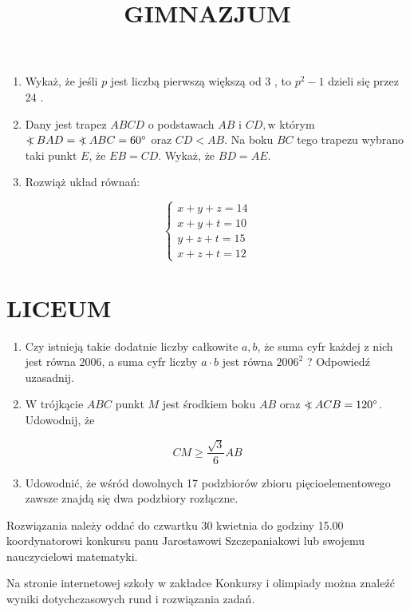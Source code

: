 \documentclass[10pt]{article}
\title{GIMNAZJUM }
\author{}
\date{}
\newcommand\Varangle{\mathop{{<\!\!\!\!\!\text{\small)}}\:}\nolimits}
\begin{document}
\maketitle
\begin{enumerate}
  \item Wykaż, że jeśli \(p\) jest liczbą pierwszą większą od 3 , to \(p^{2}-1\) dzieli się przez 24 .
  \item Dany jest trapez \(A B C D\) o podstawach \(A B\) i \(C D, \mathrm{w}\) którym \(\Varangle B A D=\Varangle A B C=60^{\circ}\) oraz \(C D<A B\). Na boku \(B C\) tego trapezu wybrano taki punkt \(E\), że \(E B=C D\). Wykaż, że \(B D=A E\).
  \item Rozwiąż układ równań:
\end{enumerate}

\[
\left\{\begin{array}{l}
x+y+z=14 \\
x+y+t=10 \\
y+z+t=15 \\
x+z+t=12
\end{array}\right.
\]

\section*{LICEUM}
\begin{enumerate}
  \item Czy istnieją takie dodatnie liczby całkowite \(a, b\), że suma cyfr każdej z nich jest równa 2006, a suma cyfr liczby \(a \cdot b\) jest równa \(2006^{2}\) ? Odpowiedź uzasadnij.
  \item W trójkącie \(A B C\) punkt \(M\) jest środkiem boku \(A B\) oraz \(\Varangle A C B=120^{\circ}\). Udowodnij, że
\end{enumerate}

\[
C M \geq \frac{\sqrt{3}}{6} A B
\]

\begin{enumerate}
  \setcounter{enumi}{2}
  \item Udowodnić, że wśród dowolnych 17 podzbiorów zbioru pięcioelementowego zawsze znajdą się dwa podzbiory rozłączne.
\end{enumerate}

Rozwiązania należy oddać do czwartku 30 kwietnia do godziny 15.00 koordynatorowi konkursu panu Jarostawowi Szczepaniakowi lub swojemu nauczycielowi matematyki.

Na stronie internetowej szkoły w zakładce Konkursy i olimpiady można znaleźć wyniki dotychczasowych rund i rozwiązania zadań.
\end{document}
